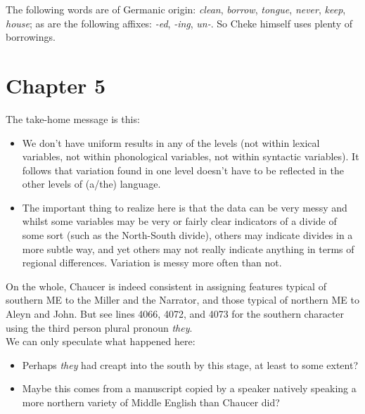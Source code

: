 \noindent\textbf{}

\noindent The following words are of Germanic origin: \textit{clean}, \textit{borrow}, \textit{tongue}, \textit{never}, \textit{keep}, \textit{house}; as are the following affixes: \textit{-ed}, \textit{-ing}, \textit{un-}. So Cheke himself uses plenty of borrowings.


\section*{Chapter 5}

\noindent\textbf{}

\noindent The take-home message is this:
\begin{itemize}
    \item We don’t have uniform results in any of the levels (not within lexical variables, not within phonological variables, not within syntactic variables). It follows that variation found in one level doesn’t have to be reflected in the other levels of (a/the) language.
    \item The important thing to realize here is that the data can be very messy and whilst some variables may be very or fairly clear indicators of a divide of some sort (such as the North-South divide), others may indicate divides in a more subtle way, and yet others may not really indicate anything in terms of regional differences. Variation is messy more often than not.
\end{itemize}


\noindent\textbf{}

\noindent On the whole, Chaucer is indeed consistent in assigning features typical of southern ME to the Miller and the Narrator, and those typical of northern ME to Aleyn and John. But see lines 4066, 4072, and 4073 for the southern character using the third person plural pronoun \textit{they}.\\

We can only speculate what happened here:
\begin{itemize}
    \item Perhaps \textit{they} had creapt into the south by this stage, at least to some extent?
    \item Maybe this comes from a manuscript copied by a speaker natively speaking a more northern variety of Middle English than Chaucer did?
\end{itemize}


